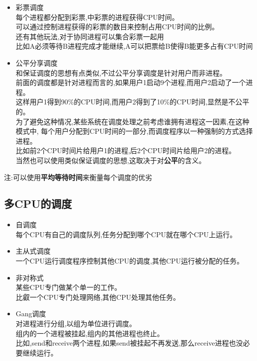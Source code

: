 \documentclass[UTF8,a4paper]{ctexart}
\begin{document}
\begin{itemize}
	\item 彩票调度\\
	      每个进程都分配到彩票,中彩票的进程获得CPU时间。\\
	      可以通过控制进程获得的彩票的数目来控制占用CPU时间的比例。\\
	      还有其他玩法,对于协同进程可以集合彩票一起用\\
	      比如A必须等待B进程完成才能继续,A可以把票给B使得B能更多占有CPU时间

	\item 公平分享调度\\
	      和保证调度的思想有点类似,不过公平分享调度是针对用户而非进程。\\
	      前面的调度都是针对进程而言的,如果用户1启动9个进程,而用户2启动了一个进程。\\
	      这样用户1得到90\%的CPU时间,而用户2得到了10\%的CPU时间,显然是不公平的。\\
	      为了避免这种情况,某些系统在调度处理之前考虑谁拥有进程这一因素,在这种模式中,
	      每个用户分配到CPU时间的一部分,而调度程序以一种强制的方式选择进程。\\
	      比如前2个CPU时间片给用户1的进程,后2个CPU时间片给用户2的进程。\\
	      当然也可以使用类似保证调度的思想,这取决于对\textbf{公平}的含义。

\end{itemize}

注:可以使用\textbf{平均等待时间}来衡量每个调度的优劣

\subsection{多CPU的调度}
\begin{itemize}
	\item 自调度\\
	      每个CPU有自己的调度队列,任务分配到哪个CPU就在哪个CPU上运行。
	\item 主从式调度\\
	      一个CPU运行调度程序控制其他CPU的调度,其他CPU运行被分配的任务。
	\item 非对称式\\
	      某些CPU专门做某个单一的工作。\\
	      比叡一个CPU专门处理网络,其他CPU处理其他任务。
	\item Gang调度\\
	      对进程进行分组,以组为单位进行调度。\\
	      组内的一个进程被挂起,组内的其他进程也终止。\\
	      比如,send和receive两个进程,如果send被挂起不再发送,那么receive进程也没必要继续运行。
\end{itemize}
\end{document}
